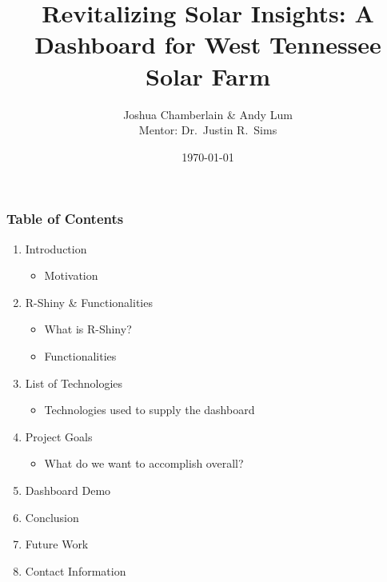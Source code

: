 \documentclass[xcolor=table]{beamer}
\begin{document}
\title{Revitalizing Solar Insights: A Dashboard for West Tennessee Solar Farm}

\author{Joshua Chamberlain \& Andy Lum \\ \vspace{0.1in} Mentor: Dr.~Justin R.~Sims}
\date{\today}



\frame{\titlepage}
\begin{frame}[c] %
%
%
\frametitle{Table of Contents} 
\begin{enumerate}
    \item<1-> Introduction
    \begin{itemize}
        \item<2-> Motivation
    \end{itemize}

    \item<3-> R-Shiny \& Functionalities
    \begin{itemize}
        \item<4-> What is R-Shiny?
        \item<5-> Functionalities
    \end{itemize}

    \item<6-> List of Technologies
    \begin{itemize}
        \item<7-> Technologies used to supply the dashboard
    \end{itemize}

    \item<8-> Project Goals
    \begin{itemize}
        \item<9-> What do we want to accomplish overall?
    \end{itemize}

    \item<10-> Dashboard Demo


    \item<11-> Conclusion

    \item<12-> Future Work

    \item<13-> Contact Information
\end{enumerate}
\end{frame}
\end{document}

